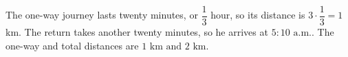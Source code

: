 The one-way journey lasts twenty minutes, or $\dfrac{1}{3}$ hour, so its distance is $3\cdot\dfrac{1}{3}=1$ km. The return takes another twenty minutes, so he arrives at $\boxed{5{:}10\text{ a.m.}}$. The one-way and total distances are $\boxed{1\text{ km and }2\text{ km}}$.
